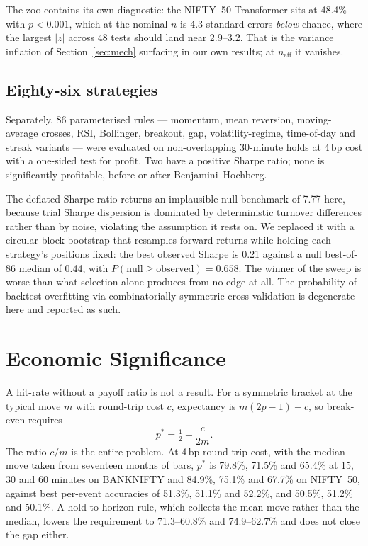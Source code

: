 \documentclass[runningheads]{llncs}
\begin{document}
The zoo contains its own diagnostic: the NIFTY~50 Transformer sits at 48.4\%
with $p<0.001$, which at the nominal $n$ is 4.3 standard errors \emph{below}
chance, where the largest $|z|$ across 48 tests should land near 2.9--3.2. That
is the variance inflation of Section~\ref{sec:mech} surfacing in our own results;
at $n_{\text{eff}}$ it vanishes.

\subsection{Eighty-six strategies}

Separately, 86 parameterised rules --- momentum, mean reversion, moving-average
crosses, RSI, Bollinger, breakout, gap, volatility-regime, time-of-day and streak
variants --- were evaluated on non-overlapping 30-minute holds at 4\,bp cost with
a one-sided test for profit. Two have a positive Sharpe ratio; none is
significantly profitable, before or after Benjamini--Hochberg.

The deflated Sharpe ratio returns an implausible null benchmark of 7.77 here,
because trial Sharpe dispersion is dominated by deterministic turnover
differences rather than by noise, violating the assumption it rests on. We
replaced it with a circular block bootstrap \cite{politis1992} that resamples
forward returns while holding each strategy's positions fixed: the best observed
Sharpe is 0.21 against a null best-of-86 median of 0.44, with
$P(\text{null} \geq \text{observed}) = 0.658$. The winner of the sweep is worse
than what selection alone produces from no edge at all. The probability of
backtest overfitting via combinatorially symmetric cross-validation
\cite{bailey2017} is degenerate here and reported as such.

\section{Economic Significance}
\label{sec:econ}

A hit-rate without a payoff ratio is not a result. For a symmetric bracket at the
typical move $m$ with round-trip cost $c$, expectancy is $m(2p-1) - c$, so
break-even requires
\begin{equation}
p^{\ast} = \tfrac{1}{2} + \frac{c}{2m}.
\label{eq:be}
\end{equation}
The ratio $c/m$ is the entire problem. At 4\,bp round-trip cost, with the
median move taken from seventeen months of bars, $p^{\ast}$ is 79.8\%, 71.5\%
and 65.4\% at 15, 30 and 60 minutes on BANKNIFTY and 84.9\%, 75.1\% and 67.7\%
on NIFTY~50, against best per-event accuracies of 51.3\%, 51.1\% and 52.2\%, and
50.5\%, 51.2\% and 50.1\%. A hold-to-horizon rule, which collects the mean move
rather than the median, lowers the requirement to 71.3--60.8\% and 74.9--62.7\%
and does not close the gap either.
\end{document}
